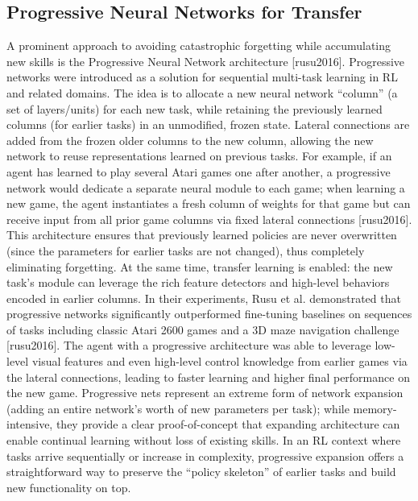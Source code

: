 \subsection{Progressive Neural Networks for Transfer}
A prominent approach to avoiding catastrophic forgetting while accumulating new skills is the Progressive Neural Network architecture [rusu2016]. Progressive networks were introduced as a solution for sequential multi-task learning in RL and related domains. The idea is to allocate a new neural network “column” (a set of layers/units) for each new task, while retaining the previously learned columns (for earlier tasks) in an unmodified, frozen state. Lateral connections are added from the frozen older columns to the new column, allowing the new network to reuse representations learned on previous tasks. For example, if an agent has learned to play several Atari games one after another, a progressive network would dedicate a separate neural module to each game; when learning a new game, the agent instantiates a fresh column of weights for that game but can receive input from all prior game columns via fixed lateral connections [rusu2016]. This architecture ensures that previously learned policies are never overwritten (since the parameters for earlier tasks are not changed), thus completely eliminating forgetting. At the same time, transfer learning is enabled: the new task’s module can leverage the rich feature detectors and high-level behaviors encoded in earlier columns. In their experiments, Rusu et al. demonstrated that progressive networks significantly outperformed fine-tuning baselines on sequences of tasks including classic Atari 2600 games and a 3D maze navigation challenge [rusu2016]. The agent with a progressive architecture was able to leverage low-level visual features and even high-level control knowledge from earlier games via the lateral connections, leading to faster learning and higher final performance on the new game. Progressive nets represent an extreme form of network expansion (adding an entire network’s worth of new parameters per task); while memory-intensive, they provide a clear proof-of-concept that expanding architecture can enable continual learning without loss of existing skills. In an RL context where tasks arrive sequentially or increase in complexity, progressive expansion offers a straightforward way to preserve the “policy skeleton” of earlier tasks and build new functionality on top.

